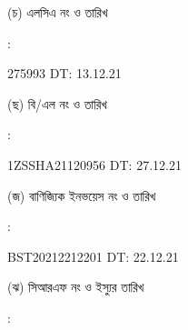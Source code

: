 \documentclass[12pt]{article}
\newcommand{\blno}{1ZSSHA21120956}
\newcommand{\bldt}{27.12.21}
\newcommand{\lcdt}{13.12.21}
\newcommand{\lcano}{275993}
\newcommand{\lcadt}{\lcdt}
\newcommand{\invno}{BST20212212201}
\newcommand{\invdt}{22.12.21}
\begin{document}
\begin{minipage}[t]{0.05\linewidth}
\hspace*{1em}
\end{minipage}
\begin{minipage}[t]{0.40\linewidth}
(চ) এলসিএ নং ও তারিখ
\end{minipage}
\begin{minipage}[t]{0.02\linewidth}
:
\end{minipage}
\begin{minipage}[t]{0.53\linewidth}
{\lcano} \hspace{2em} DT: {\lcadt}
\\
\end{minipage}
\begin{minipage}[t]{0.05\linewidth}
\hspace*{1em}
\end{minipage}
\begin{minipage}[t]{0.40\linewidth}
(ছ) বি/এল নং ও তারিখ
\end{minipage}
\begin{minipage}[t]{0.02\linewidth}
:
\end{minipage}
\begin{minipage}[t]{0.53\linewidth}
{\blno} \hspace{2em} DT: {\bldt}
\\
\end{minipage}
\begin{minipage}[t]{0.05\linewidth}
\hspace*{1em}
\end{minipage}
\begin{minipage}[t]{0.40\linewidth}
(জ) বাণিজ্যিক ইনভয়েস নং ও তারিখ
\end{minipage}
\begin{minipage}[t]{0.02\linewidth}
:
\end{minipage}
\begin{minipage}[t]{0.53\linewidth}
{\invno} \hspace{2em} DT: {\invdt}
\\
\end{minipage}
\begin{minipage}[t]{0.05\linewidth}
\hspace*{1em}
\end{minipage}
\begin{minipage}[t]{0.40\linewidth}
(ঝ) সিআরএফ নং ও ইস্যুর তারিখ
\end{minipage}
\begin{minipage}[t]{0.02\linewidth}
:
\end{minipage}
\end{document}
